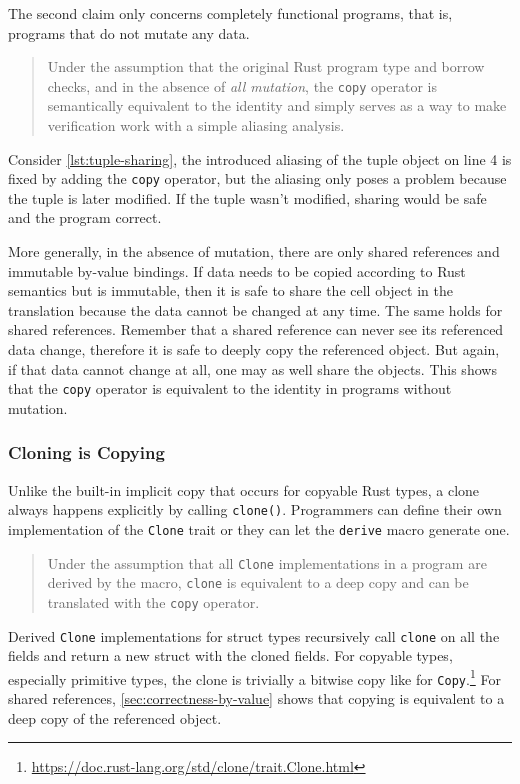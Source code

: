 The second claim only concerns completely functional programs, that is, programs
that do not mutate any data.

\begin{quote}
Under the assumption that the original Rust program type and borrow checks, and
in the absence of \emph{all mutation}, the \lstinline!copy! operator is
semantically equivalent to the identity and simply serves as a way to make
verification work with a simple aliasing analysis.
\end{quote}

Consider \autoref{lst:tuple-sharing}, the introduced aliasing of the tuple
object on line 4 is fixed by adding the \lstinline!copy! operator, but the
aliasing only poses a problem because the tuple is later modified. If the tuple
wasn't modified, sharing would be safe and the program correct.

More generally, in the absence of mutation, there are only shared references and
immutable by-value bindings. If data needs to be copied according to Rust
semantics but is immutable, then it is safe to share the cell object in the
translation because the data cannot be changed at any time. The same holds for
shared references. Remember that a shared reference can never see its referenced
data change, therefore it is safe to deeply copy the referenced object. But
again, if that data cannot change at all, one may as well share the objects.
This shows that the \lstinline!copy! operator is equivalent to the identity in
programs without mutation.

\subsubsection{Cloning is Copying}
\label{sec:clone-is-copy}

Unlike the built-in implicit copy that occurs for copyable Rust types, a clone
always happens explicitly by calling \lstinline!clone()!. Programmers can define
their own implementation of the \lstinline!Clone! trait or they can let the
\lstinline!derive! macro generate one.

\begin{quote}
Under the assumption that all \lstinline!Clone! implementations in a program are
derived by the macro, \lstinline!clone! is equivalent to a deep copy and can be
translated with the \lstinline!copy! operator.
\end{quote}

Derived \lstinline!Clone! implementations for struct types recursively call
\lstinline!clone! on all the fields and return a new struct with the cloned
fields. For copyable types, especially primitive types, the clone is trivially a
bitwise copy like for
\lstinline!Copy!.\footnote{\url{https://doc.rust-lang.org/std/clone/trait.Clone.html}}
For shared references, \autoref{sec:correctness-by-value} shows that copying is
equivalent to a deep copy of the referenced object.

